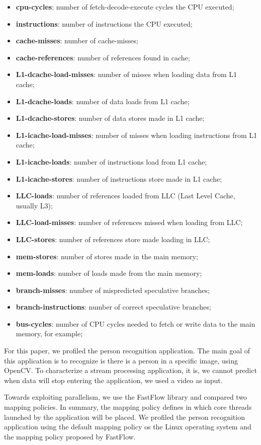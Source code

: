\begin{itemize}
	\item \textbf{cpu-cycles}: number of fetch-decode-execute cycles the CPU executed;
	\item \textbf{instructions}: number of instructions the CPU executed;
	\item \textbf{cache-misses}: number of cache-misses;
	\item \textbf{cache-references}: number of references found in cache;
	\item \textbf{L1-dcache-load-misses}: number of misses when loading data from L1 cache;
	\item \textbf{L1-dcache-loads}: number of data loads from L1 cache;
	\item \textbf{L1-dcache-stores}: number of data stores made in L1 cache;
	\item \textbf{L1-icache-load-misses}: number of misses when loading instructions from L1 cache;
	\item \textbf{L1-icache-loads}: number of instructions load from L1 cache;
	\item \textbf{L1-icache-stores}: number of instructions store made in L1 cache;
	\item \textbf{LLC-loads}: number of references loaded from LLC (Last Level Cache, usually L3);
	\item \textbf{LLC-load-misses}: number of references missed when loading from LLC;
	\item \textbf{LLC-stores}: number of references store made loading in LLC;
	\item \textbf{mem-stores}: number of stores made in the main memory;
	\item \textbf{mem-loads}: number of loads made from the main memory;
	\item \textbf{branch-misses}: number of mispredicted speculative branches;
    \item \textbf{branch-instructions}: number of correct speculative branches;
	\item \textbf{bus-cycles}: number of CPU cycles needed to fetch or write data to the main memory, for example;
\end{itemize}

For this paper, we profiled the person recognition application. The main goal of this application is to recognize is there is a person in a specific image, using OpenCV. To characterize a stream processing application, it is, we cannot predict when data will stop entering the application, we used a video as input.

Towards exploiting parallelism, we use the FastFlow library and compared two mapping policies. In summary, the mapping policy defines in which core threads launched by the application will be placed. We profiled the person recognition application using the default mapping policy os the Linux operating system and the mapping policy proposed by FastFlow.
